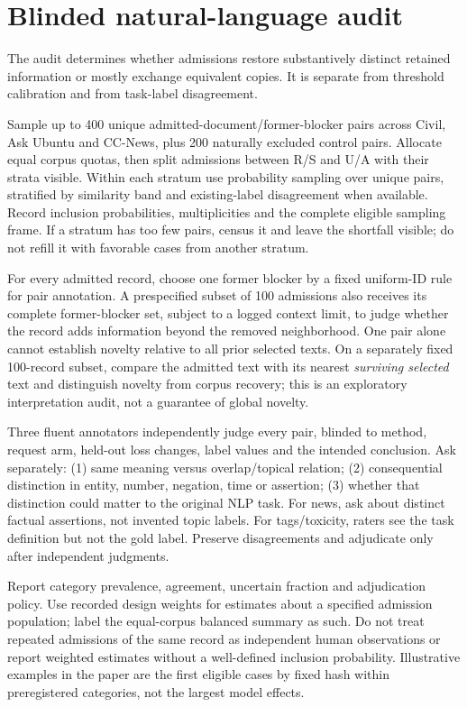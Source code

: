 \documentclass[11pt,a4paper]{article}
\begin{document}
\section{Blinded natural-language audit}
The audit determines whether admissions restore substantively distinct retained information or mostly exchange equivalent copies. It is separate from threshold calibration and from task-label disagreement.

Sample up to 400 unique admitted-document/former-blocker pairs across Civil, Ask Ubuntu and CC-News, plus 200 naturally excluded control pairs. Allocate equal corpus quotas, then split admissions between R/S and U/A with their strata visible. Within each stratum use probability sampling over unique pairs, stratified by similarity band and existing-label disagreement when available. Record inclusion probabilities, multiplicities and the complete eligible sampling frame. If a stratum has too few pairs, census it and leave the shortfall visible; do not refill it with favorable cases from another stratum.

For every admitted record, choose one former blocker by a fixed uniform-ID rule for pair annotation. A prespecified subset of 100 admissions also receives its complete former-blocker set, subject to a logged context limit, to judge whether the record adds information beyond the removed neighborhood. One pair alone cannot establish novelty relative to all prior selected texts. On a separately fixed 100-record subset, compare the admitted text with its nearest \emph{surviving selected} text and distinguish novelty from corpus recovery; this is an exploratory interpretation audit, not a guarantee of global novelty.

Three fluent annotators independently judge every pair, blinded to method, request arm, held-out loss changes, label values and the intended conclusion. Ask separately: (1) same meaning versus overlap/topical relation; (2) consequential distinction in entity, number, negation, time or assertion; (3) whether that distinction could matter to the original NLP task. For news, ask about distinct factual assertions, not invented topic labels. For tags/toxicity, raters see the task definition but not the gold label. Preserve disagreements and adjudicate only after independent judgments.

Report category prevalence, agreement, uncertain fraction and adjudication policy. Use recorded design weights for estimates about a specified admission population; label the equal-corpus balanced summary as such. Do not treat repeated admissions of the same record as independent human observations or report weighted estimates without a well-defined inclusion probability. Illustrative examples in the paper are the first eligible cases by fixed hash within preregistered categories, not the largest model effects.
\end{document}
